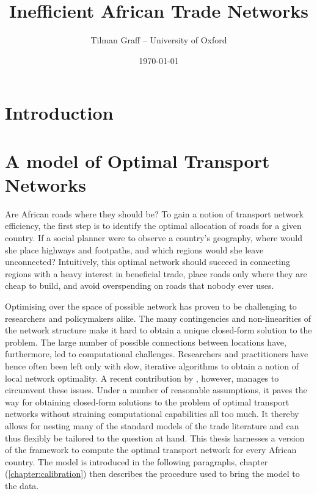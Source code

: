 \documentclass[11pt, oneside]{article}   	%
\title{Inefficient African Trade Networks}
\author{Tilman Graff -- University of Oxford}
\date{\today}
\let\oldref\ref
\renewcommand{\ref}[1]{(\oldref{#1})}
\begin{document}

\maketitle



\section{Introduction}

\section{A model of Optimal Transport Networks}

Are African roads where they should be? To gain a notion of transport network efficiency, the first step is to identify the optimal allocation of roads for a given country. If a social planner were to observe a country's geography, where would she place highways and footpaths, and which regions would she leave unconnected? Intuitively, this optimal network should succeed in connecting regions with a heavy interest in beneficial trade, place roads only where they are cheap to build, and avoid overspending on roads that nobody ever uses.

Optimising over the space of possible network has proven to be challenging to researchers and policymakers alike. The many contingencies and non-linearities of the network structure make it hard to obtain a unique closed-form solution to the problem. The large number of possible connections between locations have, furthermore, led to computational challenges. Researchers and practitioners have hence often been left only with slow, iterative algorithms to obtain a notion of local network optimality. A recent contribution by \cite{fajgelbaum_optimal_2017}, however, manages to circumvent these issues. Under a number of reasonable assumptions, it paves the way for obtaining closed-form solutions to the problem of optimal transport networks without straining computational capabilities all too much. It thereby allows for nesting many of the standard models of the trade literature and can thus flexibly be tailored to the question at hand. This thesis harnesses a version of the \citeauthor{fajgelbaum_optimal_2017} framework to compute the optimal transport network for every African country. The model is introduced in the following paragraphs, chapter \ref{chapter:calibration} then describes the procedure used to bring the model to the data.
\end{document}
